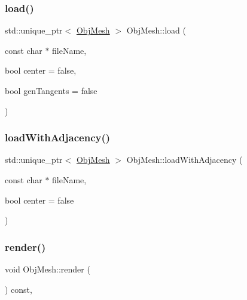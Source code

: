 \subsubsection{\texorpdfstring{load()}{load()}}
{\footnotesize\ttfamily std\+::unique\+\_\+ptr$<$ \mbox{\hyperlink{class_obj_mesh}{Obj\+Mesh}} $>$ Obj\+Mesh\+::load (\begin{DoxyParamCaption}\item[{const char $\ast$}]{file\+Name,  }\item[{bool}]{center = {\ttfamily false},  }\item[{bool}]{gen\+Tangents = {\ttfamily false} }\end{DoxyParamCaption})\hspace{0.3cm}{\ttfamily [static]}}

\mbox{\label{class_obj_mesh_adc7c1c7e377349666929592343fb627c}} 
\subsubsection{\texorpdfstring{loadWithAdjacency()}{loadWithAdjacency()}}
{\footnotesize\ttfamily std\+::unique\+\_\+ptr$<$ \mbox{\hyperlink{class_obj_mesh}{Obj\+Mesh}} $>$ Obj\+Mesh\+::load\+With\+Adjacency (\begin{DoxyParamCaption}\item[{const char $\ast$}]{file\+Name,  }\item[{bool}]{center = {\ttfamily false} }\end{DoxyParamCaption})\hspace{0.3cm}{\ttfamily [static]}}

\mbox{\label{class_obj_mesh_a735d4c7978094b8ba07cd720e496ea60}} 
\subsubsection{\texorpdfstring{render()}{render()}}
{\footnotesize\ttfamily void Obj\+Mesh\+::render (\begin{DoxyParamCaption}{ }\end{DoxyParamCaption}) const\hspace{0.3cm}{\ttfamily [override]}, {\ttfamily [virtual]}}



